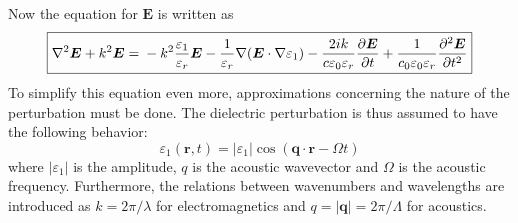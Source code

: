 \documentclass[10pt,a4paper,draft]{scrartcl}
\begin{document}
	Now the equation for $\bm{E}$ is written as
	\begin{equation*}
	\boxed{
		\nabla^2\bm{E} + k^2 \bm{E} = \\
		-k^2 \frac{\varepsilon_1}{\varepsilon_r} \bm{E} -\frac{1}{\varepsilon_r}\nabla(\bm{E} \cdot \nabla \varepsilon_1) - \frac{2ik}{c\varepsilon_0\varepsilon_r} \frac{\partial \bm{E}}{\partial t} + \frac{1}{c_0 \varepsilon_0 \varepsilon_r} \frac{\partial^2 \bm{E}}{\partial t^2}
	}
	\end{equation*}
	To simplify this equation even more, approximations concerning the nature of the perturbation must be done. The dielectric perturbation is thus assumed to have the following behavior:
	\begin{equation*}
		\varepsilon_1 (\bm{r},t) = |\varepsilon_1| \cos(\bm{q} \cdot \bm{r} - \Omega t)
	\end{equation*}
	where $|\varepsilon_1|$ is the amplitude, $q$ is the acoustic wavevector and $\Omega$ is the acoustic frequency. Furthermore, the relations between wavenumbers and wavelengths are introduced as $k = 2\pi/\lambda$ for electromagnetics and $q = |\bm{q}| = 2\pi/\Lambda$ for acoustics.
	
	\small
	
	
	
\end{document}
